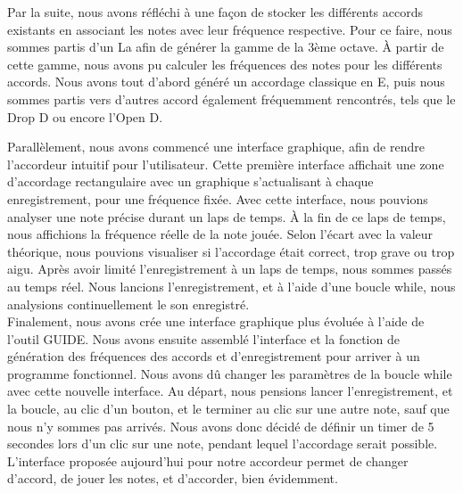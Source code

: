 Par la suite, nous avons réfléchi à une façon de stocker les différents accords existants en associant les notes avec leur fréquence respective.
Pour ce faire, nous sommes partis d'un La  afin de générer la gamme de la 3ème octave. À partir de cette gamme, nous avons pu calculer les fréquences des notes pour les différents accords. Nous avons tout d'abord généré un accordage classique en E, puis nous sommes partis vers d'autres accord également fréquemment rencontrés, tels que le Drop D ou encore l'Open D.

Parallèlement, nous avons commencé une interface graphique, afin de rendre l'accordeur intuitif pour l'utilisateur.
Cette première interface affichait une zone d'accordage rectangulaire avec un graphique s'actualisant à chaque enregistrement, pour une fréquence fixée.
Avec cette interface, nous pouvions analyser une note précise durant un laps de temps. À la fin de ce laps de temps, nous affichions la fréquence réelle de la note jouée. Selon l'écart avec la valeur théorique, nous pouvions visualiser si l'accordage était correct, trop grave ou trop aigu. Après avoir limité l'enregistrement à un laps de temps, nous sommes passés au temps réel. Nous lancions l'enregistrement, et à l'aide d'une boucle while, nous analysions continuellement le son enregistré. \\

Finalement, nous avons crée une interface graphique plus évoluée à l'aide de l'outil GUIDE. Nous avons ensuite assemblé l'interface et la fonction de génération des fréquences des accords et d'enregistrement pour arriver à un programme fonctionnel. Nous avons dû changer les paramètres de la boucle while avec cette nouvelle interface. Au départ, nous pensions lancer l'enregistrement, et la boucle, au clic d'un bouton, et le terminer au clic sur une autre note, sauf que nous n'y sommes pas arrivés. Nous avons donc décidé de définir un timer de 5 secondes lors d'un clic sur une note, pendant lequel l'accordage serait possible. 
L'interface proposée aujourd'hui pour notre accordeur permet de changer d'accord, de jouer les notes, et d'accorder, bien évidemment.


